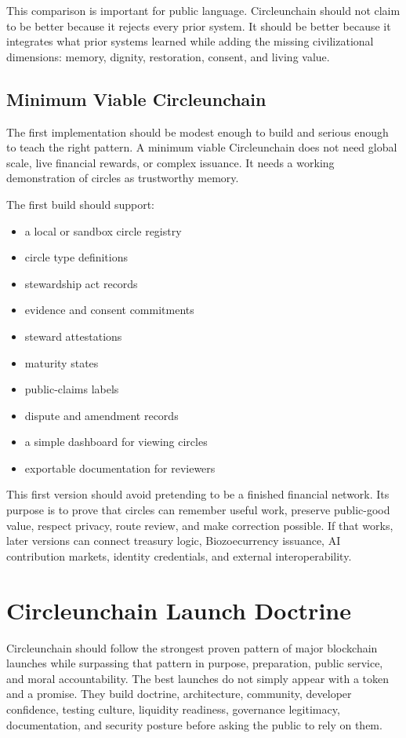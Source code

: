 \documentclass[12pt]{article}
\begin{document}
This comparison is important for public language. Circleunchain should not claim to be better because it rejects every prior system. It should be better because it integrates what prior systems learned while adding the missing civilizational dimensions: memory, dignity, restoration, consent, and living value.

\subsection{Minimum Viable Circleunchain}

The first implementation should be modest enough to build and serious enough to teach the right pattern. A minimum viable Circleunchain does not need global scale, live financial rewards, or complex issuance. It needs a working demonstration of circles as trustworthy memory.

The first build should support:

\begin{itemize}
  \item a local or sandbox circle registry
  \item circle type definitions
  \item stewardship act records
  \item evidence and consent commitments
  \item steward attestations
  \item maturity states
  \item public-claims labels
  \item dispute and amendment records
  \item a simple dashboard for viewing circles
  \item exportable documentation for reviewers
\end{itemize}

This first version should avoid pretending to be a finished financial network. Its purpose is to prove that circles can remember useful work, preserve public-good value, respect privacy, route review, and make correction possible. If that works, later versions can connect treasury logic, Biozoecurrency issuance, AI contribution markets, identity credentials, and external interoperability.

\section{Circleunchain Launch Doctrine}

Circleunchain should follow the strongest proven pattern of major blockchain launches while surpassing that pattern in purpose, preparation, public service, and moral accountability. The best launches do not simply appear with a token and a promise. They build doctrine, architecture, community, developer confidence, testing culture, liquidity readiness, governance legitimacy, documentation, and security posture before asking the public to rely on them.
\end{document}
